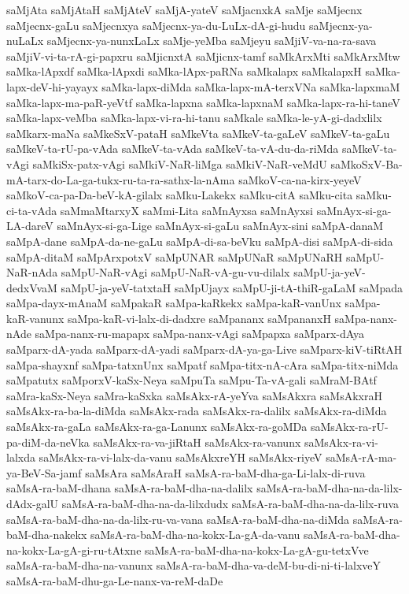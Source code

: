 {saMjAta
saMjAtaH
saMjAteV
saMjA-yateV
saMjacnxkA
saMje
saMjecnx
saMjecnx-gaLu
saMjecnxya
saMjecnx-ya-du-LuLx-dA-gi-hudu
saMjecnx-ya-nuLaLx
saMjecnx-ya-nunxLaLx
saMje-yeMba
saMjeyu
saMjiV-va-na-ra-sava
saMjiV-vi-ta-rA-gi-papxru
saMjicnxtA
saMjicnx-tamf
saMkArxMti
saMkArxMtw
saMka-lApxdf
saMka-lApxdi
saMka-lApx-paRNa
saMkalapx
saMkalapxH
saMka-lapx-deV-hi-yayayx
saMka-lapx-diMda
saMka-lapx-mA-terxVNa
saMka-lapxmaM
saMka-lapx-ma-paR-yeVtf
saMka-lapxna
saMka-lapxnaM
saMka-lapx-ra-hi-taneV
saMka-lapx-veMba
saMka-lapx-vi-ra-hi-tanu
saMkale
saMka-le-yA-gi-dadxlilx
saMkarx-maNa
saMkeSxV-pataH
saMkeVta
saMkeV-ta-gaLeV
saMkeV-ta-gaLu
saMkeV-ta-rU-pa-vAda
saMkeV-ta-vAda
saMkeV-ta-vA-du-da-riMda
saMkeV-ta-vAgi
saMkiSx-patx-vAgi
saMkiV-NaR-liMga
saMkiV-NaR-veMdU
saMkoSxV-Ba-mA-tarx-do-La-ga-tukx-ru-ta-ra-sathx-la-nAma
saMkoV-ca-na-kirx-yeyeV
saMkoV-ca-pa-Da-beV-kA-gilalx
saMku-Lakekx
saMku-citA
saMku-cita
saMku-ci-ta-vAda
saMmaMtarxyX
saMmi-Lita
saMnAyxsa
saMnAyxsi
saMnAyx-si-ga-LA-dareV
saMnAyx-si-ga-Lige
saMnAyx-si-gaLu
saMnAyx-sini
saMpA-danaM
saMpA-dane
saMpA-da-ne-gaLu
saMpA-di-sa-beVku
saMpA-disi
saMpA-di-sida
saMpA-ditaM
saMpArxpotxV
saMpUNAR
saMpUNaR
saMpUNaRH
saMpU-NaR-nAda
saMpU-NaR-vAgi
saMpU-NaR-vA-gu-vu-dilalx
saMpU-ja-yeV-dedxVvaM
saMpU-ja-yeV-tatxtaH
saMpUjayx
saMpU-ji-tA-thiR-gaLaM
saMpada
saMpa-dayx-mAnaM
saMpakaR
saMpa-kaRkekx
saMpa-kaR-vanUnx
saMpa-kaR-vanunx
saMpa-kaR-vi-lalx-di-dadxre
saMpananx
saMpananxH
saMpa-nanx-nAde
saMpa-nanx-ru-mapapx
saMpa-nanx-vAgi
saMpapxa
saMparx-dAya
saMparx-dA-yada
saMparx-dA-yadi
saMparx-dA-ya-ga-Live
saMparx-kiV-tiRtAH
saMpa-shayxnf
saMpa-tatxnUnx
saMpatf
saMpa-titx-nA-cAra
saMpa-titx-niMda
saMpatutx
saMporxV-kaSx-Neya
saMpuTa
saMpu-Ta-vA-gali
saMraM-BAtf
saMra-kaSx-Neya
saMra-kaSxka
saMsAkx-rA-yeYva
saMsAkxra
saMsAkxraH
saMsAkx-ra-ba-la-diMda
saMsAkx-rada
saMsAkx-ra-dalilx
saMsAkx-ra-diMda
saMsAkx-ra-gaLa
saMsAkx-ra-ga-Lanunx
saMsAkx-ra-goMDa
saMsAkx-ra-rU-pa-diM-da-neVka
saMsAkx-ra-va-jiRtaH
saMsAkx-ra-vanunx
saMsAkx-ra-vi-lalxda
saMsAkx-ra-vi-lalx-da-vanu
saMsAkxreYH
saMsAkx-riyeV
saMsA-rA-ma-ya-BeV-Sa-jamf
saMsAra
saMsAraH
saMsA-ra-baM-dha-ga-Li-lalx-di-ruva
saMsA-ra-baM-dhana
saMsA-ra-baM-dha-na-dalilx
saMsA-ra-baM-dha-na-da-lilx-dAdx-galU
saMsA-ra-baM-dha-na-da-lilxdudx
saMsA-ra-baM-dha-na-da-lilx-ruva
saMsA-ra-baM-dha-na-da-lilx-ru-va-vana
saMsA-ra-baM-dha-na-diMda
saMsA-ra-baM-dha-nakekx
saMsA-ra-baM-dha-na-kokx-La-gA-da-vanu
saMsA-ra-baM-dha-na-kokx-La-gA-gi-ru-tAtxne
saMsA-ra-baM-dha-na-kokx-La-gA-gu-tetxVve
saMsA-ra-baM-dha-na-vanunx
saMsA-ra-baM-dha-va-deM-bu-di-ni-ti-lalxveY
saMsA-ra-baM-dhu-ga-Le-nanx-va-reM-daDe
}
